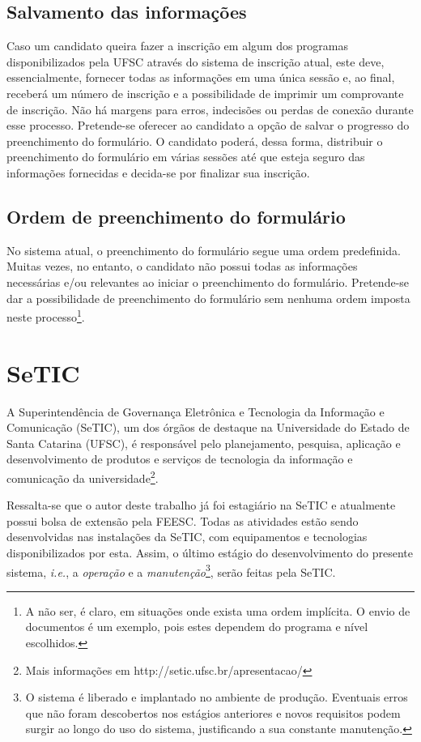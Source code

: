 \documentclass[
  10.5pt,				  %
	openright,			%
	twoside,			  %
  a5paper,
  chapter=TITLE,	%
	section=TITLE,	%
  hyphens,        %
	english,        %
	brazil          %
]{abntex2}
\begin{document}
\subsection{Salvamento das informações}
Caso um candidato queira fazer a inscrição em algum dos programas disponibilizados pela UFSC através do sistema de inscrição atual, este deve, essencialmente, fornecer todas as informações em uma única sessão e, ao final, receberá um número de inscrição e a possibilidade de imprimir um comprovante de inscrição. Não há margens para erros, indecisões ou perdas de conexão durante esse processo. Pretende-se oferecer ao candidato a opção de salvar o progresso do preenchimento do formulário. O candidato poderá, dessa forma, distribuir o preenchimento do formulário em várias sessões até que esteja seguro das informações fornecidas e decida-se por finalizar sua inscrição.

\subsection{Ordem de preenchimento do formulário}
No sistema atual, o preenchimento do formulário segue uma ordem predefinida. Muitas vezes, no entanto, o candidato não possui todas as informações necessárias e/ou relevantes ao iniciar o preenchimento do formulário. Pretende-se dar a possibilidade de preenchimento do formulário sem nenhuma ordem imposta neste processo\footnote{A não ser, é claro, em situações onde exista uma ordem implícita. O envio de documentos é um exemplo, pois estes dependem do programa e nível escolhidos.}.

\section{SeTIC}

A Superintendência de Governança Eletrônica e Tecnologia da Informação e Comunicação (SeTIC), um dos órgãos de destaque na Universidade do Estado de Santa Catarina (UFSC), é responsável pelo planejamento, pesquisa, aplicação e desenvolvimento de produtos e serviços de tecnologia da informação e comunicação da universidade\footnote{Mais informações em http://setic.ufsc.br/apresentacao/}.

Ressalta-se que o autor deste trabalho já foi estagiário na SeTIC e atualmente possui bolsa de extensão pela FEESC. Todas as atividades estão sendo desenvolvidas nas instalações da SeTIC, com equipamentos e tecnologias disponibilizados por esta. Assim, o último estágio do desenvolvimento do presente sistema, \emph{i.e.}, a \emph{operação} e a \emph{manutenção}\footnote{O sistema é liberado e implantado no ambiente de produção. Eventuais erros que não foram descobertos nos estágios anteriores e novos requisitos podem surgir ao longo do uso do sistema, justificando a sua constante manutenção.}, serão feitas pela SeTIC.
\end{document}
